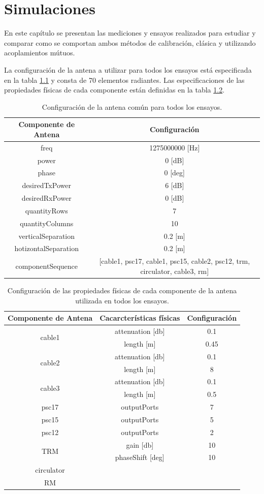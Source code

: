 \chapter{Simulaciones}

En este capítulo se presentan las mediciones y ensayos realizados para estudiar y comparar como se comportan ambos métodos de
calibración, clásica y utilizando acoplamientos mútuos.

La configuración de la antena a utilizar para todos los ensayos está especificada en la tabla \ref{tab:configurationUsed} y 
consta de 70 elementos radiantes. Las especificaciones de las propiedades físicas de cada componente están definidas en la 
tabla \ref{tab:configurationOfComponents}.
\begin{table}[H]
  \footnotesize
  \centering
  \begin{tabular}{|c|c|}
	\hline
	\textbf{Componente de Antena} & \textbf{Configuración} \tabularnewline \hline 
	freq &  1275000000 [Hz] \tabularnewline\hline 
	power & 0 [dB] \tabularnewline \hline 
	phase & 0 [deg] \tabularnewline \hline 
	desiredTxPower & 6 [dB] \tabularnewline \hline 
	desiredRxPower & 0 [dB] \tabularnewline \hline 
	quantityRows & 7 \tabularnewline \hline 
	quantityColumns & 10 \tabularnewline \hline 
	verticalSeparation & 0.2 [m] \tabularnewline \hline 
	hotizontalSeparation & 0.2 [m] \tabularnewline \hline 
	componentSequence & [cable1, psc17, cable1, psc15, cable2, psc12, trm, circulator, cable3, rm] \tabularnewline \hline 
  \end{tabular}
  \caption{Configuración de la antena común para todos los ensayos.}
  \label{tab:configurationUsed}
\end{table}
\begin{table}[H]
  \footnotesize
  \centering
  \begin{tabular}{|c|c|c|}
	\hline
	\textbf{Componente de Antena} & \textbf{Cacarcterísticas físicas} & \textbf{Configuración} \tabularnewline \hline 
	\multirow{2}{*}{cable1} &  attenuation [db] & 0.1\tabularnewline \cline{2-3}
	 & length [m] & 0.45\tabularnewline \hline 
	\multirow{2}{*}{cable2} &  attenuation [db] & 0.1\tabularnewline \cline{2-3}
	 & length [m] & 8\tabularnewline \hline 
	\multirow{2}{*}{cable3} &  attenuation [db] & 0.1\tabularnewline \cline{2-3}
	 & length [m] & 0.5\tabularnewline \hline 
	psc17 & outputPorts & 7\tabularnewline \hline
	psc15 & outputPorts & 5\tabularnewline \hline
	psc12 & outputPorts & 2\tabularnewline \hline
	\multirow{2}{*}{TRM} & gain [db] & 10\tabularnewline \cline{2-3}
	 & phaseShift [deg] & 10\tabularnewline \hline 
	circulator & & \tabularnewline \hline 
	RM & & \tabularnewline \hline 
  \end{tabular}
  \caption{Configuración de las propiedades físicas de cada componente de la antena utilizada en todos los ensayos.}
  \label{tab:configurationOfComponents}
\end{table}
